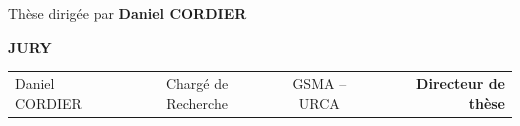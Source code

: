 \vspace{2cm}


\begin{center}
	\@title
\end{center}

\begin{center}
Thèse dirigée par \textbf{Daniel CORDIER}
\end{center}


\vfill
\begin{center}
\textbf{JURY}
\end{center}
\begin{center}
\begin{tabular*}{0.99\textwidth}{l c c r}
Daniel CORDIER	& Chargé de Recherche & GSMA -- URCA & \textbf{Directeur de thèse}
\end{tabular*}
\end{center}